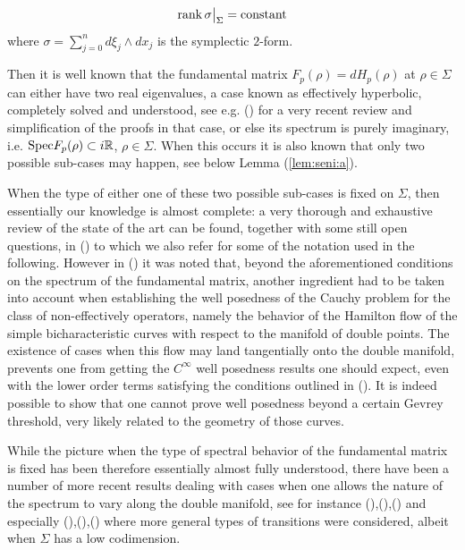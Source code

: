 \documentclass[12pt,leqno]{article} %
\def\R{{\mathbb R}}
\def\R{\mathbb{R}}
\numberwithin{equation}{section}
\begin{document}
%
\begin{equation}
\label{eq:rank}
{\rm rank\,}\sigma\big|_{\Sigma}={\rm constant}
\end{equation}
%
where $\sigma=\sum_{j=0}^nd\xi_j\wedge d x_j$ is the symplectic $2$-form. 

Then it is well known that the fundamental matrix $ F_{p}(\rho) =
dH_{p}(\rho) $ at $ \rho \in \Sigma $ can either have two real
eigenvalues, a case known as effectively hyperbolic, completely solved
and understood, see e.g. (\cite{MR4718636}) for a very recent review and
simplification of the proofs in that case,  or else its
spectrum is purely imaginary, i.e.  ${\rm Spec}F_p(\rho)\subset i\R$,
$ \rho\in\Sigma$. When this occurs it is also known that only two possible sub-cases may happen,
see below Lemma (\ref{lem:seni:a}). 

When the type of either one of these two possible sub-cases is fixed on $ \Sigma $, then essentially our
knowledge is almost complete: a very thorough and exhaustive review of the state of the art
can be found, together with some still open questions, in
(\cite{MR3726883}) to which we also refer for some of the notation used in
the following.
However in (\cite{MR2438425}) it was noted that, beyond the
aforementioned conditions on the spectrum of the fundamental matrix,
another ingredient had to be taken into account when establishing the
well posedness of the Cauchy problem for the class of non-effectively operators, namely the behavior of the
Hamilton flow of the simple bicharacteristic curves with respect to
the manifold of double points. The existence of cases when this flow
may land tangentially onto the double manifold, prevents one from getting
the $ C^{\infty} $ well posedness results one should expect, even with
the lower order terms satisfying the conditions outlined in (\cite{MR492751}).
It is indeed possible to show that one cannot prove  well posedness beyond  a certain
Gevrey threshold, very likely related to the geometry of those curves.

While the picture when the type of spectral behavior of the fundamental
matrix is fixed has been therefore essentially almost fully understood, there have
been a number of more recent results dealing with cases when one allows the nature of the spectrum to vary
along the double manifold, see for instance
(\cite{MR1464121}),(\cite{MR2942985}),(\cite{MR1848348}) and especially
(\cite{MR3185898}),(\cite{MR3362026}),(\cite{MR3784872}) where more
general types of transitions were considered, albeit when $
\Sigma $ has a low codimension.
\end{document}
